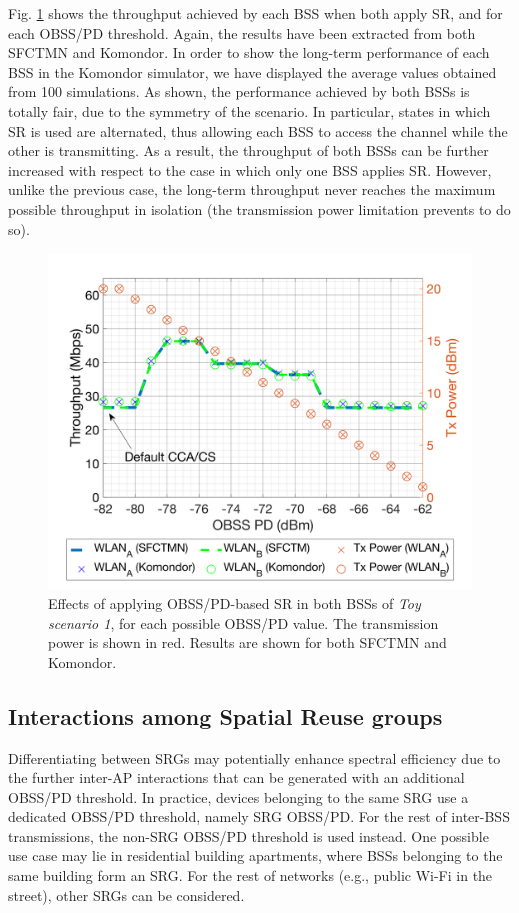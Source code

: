 \documentclass{article}
\begin{document}
Fig. \ref{fig:toy_scenario_1c_results} shows the throughput achieved by each BSS when both apply SR, and for each OBSS/PD threshold. Again, the results have been extracted from both SFCTMN and Komondor. In order to show the long-term performance of each BSS in the Komondor simulator, we have displayed the average values obtained from 100 simulations. As shown, the performance achieved by both BSSs is totally fair, due to the symmetry of the scenario. In particular, states in which SR is used are alternated, thus allowing each BSS to access the channel while the other is transmitting. As a result, the throughput of both BSSs can be further increased with respect to the case in which only one BSS applies SR. However, unlike the previous case, the long-term throughput never reaches the maximum possible throughput in isolation (the transmission power limitation prevents to do so).

\begin{figure}[ht!]
	\centering
	\includegraphics[width=.6\columnwidth]{SIM_1_1b}
	\caption{Effects of applying OBSS/PD-based SR in both BSSs of \emph{Toy scenario 1}, for each possible OBSS/PD value. The transmission power is shown in red. Results are shown for both SFCTMN and Komondor.}		
	\label{fig:toy_scenario_1c_results}
\end{figure}

\subsection{Interactions among Spatial Reuse groups}
\label{section:advanced_interactions}
Differentiating between SRGs may potentially enhance spectral efficiency due to the further inter-AP interactions that can be generated with an additional OBSS/PD threshold. In practice, devices belonging to the same SRG use a dedicated OBSS/PD threshold, namely SRG OBSS/PD. For the rest of inter-BSS transmissions, the non-SRG OBSS/PD threshold is used instead. One possible use case may lie in residential building apartments, where BSSs belonging to the same building form an SRG. For the rest of networks (e.g., public Wi-Fi in the street), other SRGs can be considered.
\end{document}
